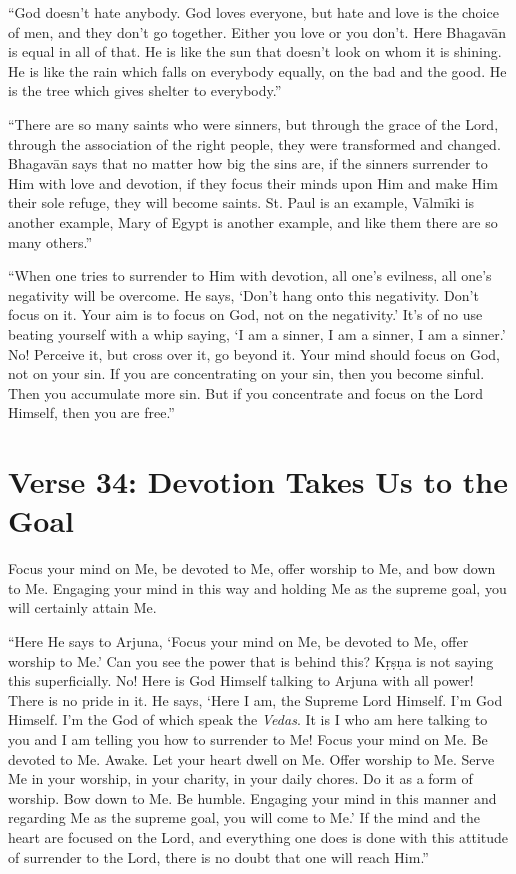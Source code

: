 \enquote{God doesn’t hate anybody. God loves everyone, but hate and love is the choice of men, and they don’t go together. Either you love or you don’t. Here Bhagavān is equal in all of that. He is like the sun that doesn’t look on whom it is shining. He is like the rain which falls on everybody equally, on the bad and the good. He is the tree which gives shelter to everybody.}

\enquote{There are so many saints who were sinners, but through the grace of the Lord, through the association of the right people, they were transformed and changed. Bhagavān says that no matter how big the sins are, if the sinners surrender to Him with love and devotion, if they focus their minds upon Him and make Him their sole refuge, they will become saints. St. Paul is an example, Vālmīki is another example, Mary of Egypt is another example, and like them there are so many others.}

\enquote{When one tries to surrender to Him with devotion, all one’s evilness, all one’s negativity will be overcome. He says, \enquote{Don’t hang onto this negativity. Don’t focus on it. Your aim is to focus on God, not on the negativity.} It’s of no use beating yourself with a whip saying, \enquote{I am a sinner, I am a sinner, I am a sinner.} No! Perceive it, but cross over it, go beyond it. Your mind should focus on God, not on your sin. If you are concentrating on your sin, then you become sinful. Then you accumulate more sin. But if you concentrate and focus on the Lord Himself, then you are free.}



\section{Verse 34: Devotion Takes Us to the Goal}\label{sec-verse-34-devotion-takes-us-to-the-goal}



{Focus your mind on Me, be devoted to Me, offer worship to Me, and bow down to Me. Engaging your mind in this way and holding Me as the supreme goal, you will certainly attain Me.}

\enquote{Here He says to Arjuna, \enquote{Focus your mind on Me, be devoted to Me, offer worship to Me.} Can you see the power that is behind this? Kṛṣṇa is not saying this superficially. No! Here is God Himself talking to Arjuna with all power! There is no pride in it. He says, \enquote{Here I am, the Supreme Lord Himself. I’m God Himself. I’m the God of which speak the \textit{Vedas}. It is I who am here talking to you and I am telling you how to surrender to Me! Focus your mind on Me. Be devoted to Me. Awake. Let your heart dwell on Me. Offer worship to Me. Serve Me in your worship, in your charity, in your daily chores. Do it as a form of worship. Bow down to Me. Be humble. Engaging your mind in this manner and regarding Me as the supreme goal, you will come to Me.} If the mind and the heart are focused on the Lord, and everything one does is done with this attitude of surrender to the Lord, there is no doubt that one will reach Him.}
